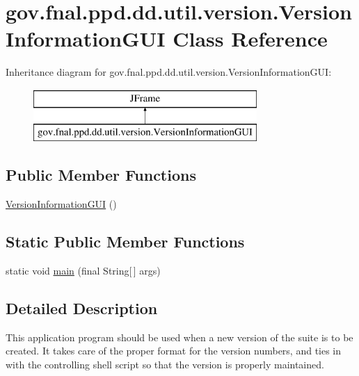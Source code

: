 \hypertarget{classgov_1_1fnal_1_1ppd_1_1dd_1_1util_1_1version_1_1VersionInformationGUI}{\section{gov.\-fnal.\-ppd.\-dd.\-util.\-version.\-Version\-Information\-G\-U\-I Class Reference}
\label{classgov_1_1fnal_1_1ppd_1_1dd_1_1util_1_1version_1_1VersionInformationGUI}
}
Inheritance diagram for gov.\-fnal.\-ppd.\-dd.\-util.\-version.\-Version\-Information\-G\-U\-I\-:\begin{figure}[H]
\begin{center}
\leavevmode
\includegraphics[height=2.000000cm]{classgov_1_1fnal_1_1ppd_1_1dd_1_1util_1_1version_1_1VersionInformationGUI}
\end{center}
\end{figure}
\subsection*{Public Member Functions}
\begin{DoxyCompactItemize}
\item 
\hyperlink{classgov_1_1fnal_1_1ppd_1_1dd_1_1util_1_1version_1_1VersionInformationGUI_a49d0ce270ef75b71e3ca79fed63d2c28}{Version\-Information\-G\-U\-I} ()
\end{DoxyCompactItemize}
\subsection*{Static Public Member Functions}
\begin{DoxyCompactItemize}
\item 
static void \hyperlink{classgov_1_1fnal_1_1ppd_1_1dd_1_1util_1_1version_1_1VersionInformationGUI_af31ef0bbe7ac5b7acc1a2b0860714270}{main} (final String\mbox{[}$\,$\mbox{]} args)
\end{DoxyCompactItemize}


\subsection{Detailed Description}
This application program should be used when a new version of the suite is to be created. It takes care of the proper format for the version numbers, and ties in with the controlling shell script so that the version is properly maintained. 

